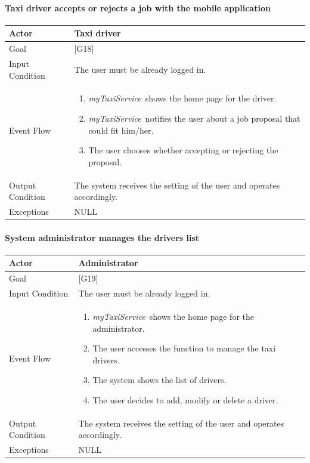 \documentclass[a4paper,11pt]{report} %
\newcommand{\mts}{\mbox{\normalfont\itshape myTaxiService\ }}
\begin{document}
	\pagebreak
	
	\paragraph{Taxi driver accepts or rejects a job with the mobile application}
	\begin{center}
		\begin{tabular}{| l | p{9cm} |}\hline
			Actor & Taxi driver\\\hline
			Goal & {[}G18{]} \\\hline
			Input Condition & The user must be already logged in.\\\hline
			Event Flow & \begin{enumerate}
				\item \mts shows the home page for the driver.
				\item \mts notifies the user about a job proposal that could fit him/her.	
				\item The user chooses whether accepting or rejecting the proposal.
			\end{enumerate}\\\hline
			Output Condition & The system receives the setting of the user and operates accordingly.\\\hline
			Exceptions & NULL\\\hline
		\end{tabular}
	\end{center}
	
	\pagebreak
	
	\paragraph{System administrator manages the drivers list}
	\begin{center}
		\begin{tabular}{| l | p{9cm} |}\hline
			Actor & Administrator\\\hline
			Goal & {[}G19{]} \\\hline
			Input Condition & The user must be already logged in.\\\hline
			Event Flow & \begin{enumerate}
				\item \mts shows the home page for the administrator.
				\item The user accesses the function to manage the taxi drivers.	
				\item The system shows the list of drivers.
				\item The user decides to add, modify or delete a driver.
			\end{enumerate}\\\hline
			Output Condition & The system receives the setting of the user and operates accordingly.\\\hline
			Exceptions & NULL\\\hline
		\end{tabular}
	\end{center}
	
\end{document}
